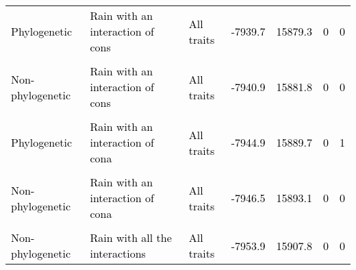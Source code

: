 \documentclass[
  12pt,
  letterpaper,
  DIV=11,
  numbers=noendperiod]{scrartcl}
\begin{document}
\begin{table}[H]
{\begin{tabular}[t]{lllllll}
\addlinespace
\textcolor{black}{Phylogenetic} & \textcolor{black}{Rain with an interaction of cons} & \textcolor{black}{All traits} & \textcolor{black}{-7939.7} & \textcolor{black}{15879.3} & \textcolor{black}{0} & \textcolor{black}{0}\\
\cellcolor{gray!6}{\textcolor{black}{Non-phylogenetic}} & \cellcolor{gray!6}{\textcolor{black}{Rain without interactions}} & \cellcolor{gray!6}{\textcolor{black}{All traits}} & \cellcolor{gray!6}{\textcolor{black}{-7940.2}} & \cellcolor{gray!6}{\textcolor{black}{15880.3}} & \cellcolor{gray!6}{\textcolor{black}{0}} & \cellcolor{gray!6}{\textcolor{black}{0}}\\
\textcolor{black}{Non-phylogenetic} & \textcolor{black}{Rain with an interaction of cons} & \textcolor{black}{All traits} & \textcolor{black}{-7940.9} & \textcolor{black}{15881.8} & \textcolor{black}{0} & \textcolor{black}{0}\\
\cellcolor{gray!6}{\textcolor{black}{Phylogenetic}} & \cellcolor{gray!6}{\textcolor{black}{Rain with an interaction of cons and cona}} & \cellcolor{gray!6}{\textcolor{black}{All traits}} & \cellcolor{gray!6}{\textcolor{black}{-7944.7}} & \cellcolor{gray!6}{\textcolor{black}{15889.4}} & \cellcolor{gray!6}{\textcolor{black}{0}} & \cellcolor{gray!6}{\textcolor{black}{0}}\\
\textcolor{black}{Phylogenetic} & \textcolor{black}{Rain with an interaction of cona} & \textcolor{black}{All traits} & \textcolor{black}{-7944.9} & \textcolor{black}{15889.7} & \textcolor{black}{0} & \textcolor{black}{1}\\
\addlinespace
\cellcolor{gray!6}{\textcolor{black}{Non-phylogenetic}} & \cellcolor{gray!6}{\textcolor{black}{Rain with an interaction of cons and cona}} & \cellcolor{gray!6}{\textcolor{black}{All traits}} & \cellcolor{gray!6}{\textcolor{black}{-7945.8}} & \cellcolor{gray!6}{\textcolor{black}{15891.7}} & \cellcolor{gray!6}{\textcolor{black}{0}} & \cellcolor{gray!6}{\textcolor{black}{0}}\\
\textcolor{black}{Non-phylogenetic} & \textcolor{black}{Rain with an interaction of cona} & \textcolor{black}{All traits} & \textcolor{black}{-7946.5} & \textcolor{black}{15893.1} & \textcolor{black}{0} & \textcolor{black}{0}\\
\cellcolor{gray!6}{\textcolor{black}{Phylogenetic}} & \cellcolor{gray!6}{\textcolor{black}{Rain with all the interactions}} & \cellcolor{gray!6}{\textcolor{black}{All traits}} & \cellcolor{gray!6}{\textcolor{black}{-7953.4}} & \cellcolor{gray!6}{\textcolor{black}{15906.7}} & \cellcolor{gray!6}{\textcolor{black}{0}} & \cellcolor{gray!6}{\textcolor{black}{0}}\\
\textcolor{black}{Non-phylogenetic} & \textcolor{black}{Rain with all the interactions} & \textcolor{black}{All traits} & \textcolor{black}{-7953.9} & \textcolor{black}{15907.8} & \textcolor{black}{0} & \textcolor{black}{0}\\
\bottomrule
\end{tabular}}
\end{table}
\end{document}
